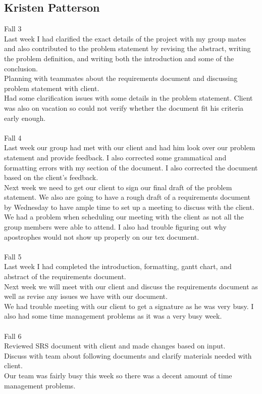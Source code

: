 \subsection{Kristen Patterson}
Fall 3\\
Last week I had clarified the exact details of the project with my group mates and also contributed to the problem statement by revising the abstract, writing the problem definition, and writing both the introduction and some of the conclusion.\\ Planning with teammates about the requirements document and discussing problem statement with client.\\ Had some clarification issues with some details in the problem statement. Client was also on vacation so could not verify whether the document fit his criteria early enough.\\
\\
Fall 4\\
Last week our group had met with our client and had him look over our problem statement and provide feedback. I also corrected some grammatical and formatting errors with my section of the document. I also corrected the document based on the client's feedback.\\ Next week we need to get our client to sign our final draft of the problem statement. We also are going to have a rough draft of a requirements document by Wednesday to have ample time to set up a meeting to discuss with the client.\\ We had a problem when scheduling our meeting with the client as not all the group members were able to attend. I also had trouble figuring out why apostrophes would not show up properly on our tex document.\\
\\
Fall 5\\
Last week I had completed the introduction, formatting, gantt chart, and abstract of the requirements document.\\ Next week we will meet with our client and discuss the requirements document as well as revise any issues we have with our document.\\ We had trouble meeting with our client to get a signature as he was very busy. I also had some time management problems as it was a very busy week.\\
\\
Fall 6\\
Reviewed SRS document with client and made changes based on input.\\ Discuss with team about following documents and clarify materials needed with client.\\ Our team was fairly busy this week so there was a decent amount of time management problems.\\
